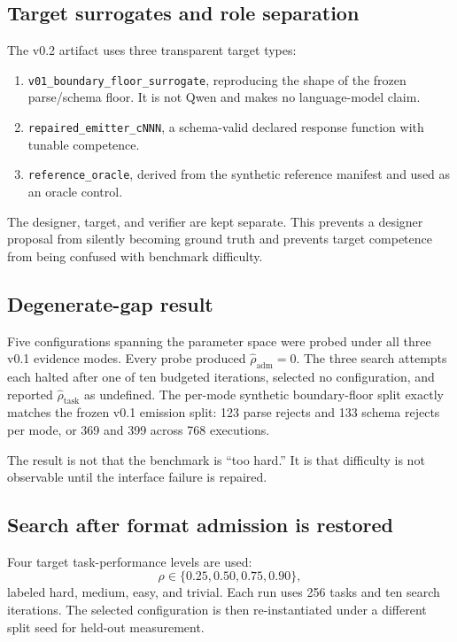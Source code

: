 \documentclass[11pt]{article}
\newcommand{\rhatadm}{\widehat{\rho}_{\mathrm{adm}}}
\newcommand{\rhattask}{\widehat{\rho}_{\mathrm{task}}}
\newcommand{\code}[1]{\texttt{#1}}
\begin{document}
\subsection{Target surrogates and role separation}

The v0.2 artifact uses three transparent target types:

\begin{enumerate}
  \item \code{v01\_boundary\_floor\_surrogate}, reproducing the shape of the frozen parse/schema floor. It is not Qwen and makes no language-model claim.
  \item \code{repaired\_emitter\_cNNN}, a schema-valid declared response function with tunable competence.
  \item \code{reference\_oracle}, derived from the synthetic reference manifest and used as an oracle control.
\end{enumerate}

The designer, target, and verifier are kept separate. This prevents a designer proposal from silently becoming ground truth and prevents target competence from being confused with benchmark difficulty.

\subsection{Degenerate-gap result}

Five configurations spanning the parameter space were probed under all three v0.1 evidence modes. Every probe produced \(\rhatadm=0\). The three search attempts each halted after one of ten budgeted iterations, selected no configuration, and reported \(\rhattask\) as undefined. The per-mode synthetic boundary-floor split exactly matches the frozen v0.1 emission split: 123 parse rejects and 133 schema rejects per mode, or 369 and 399 across 768 executions.

The result is not that the benchmark is ``too hard.'' It is that difficulty is not observable until the interface failure is repaired.

\subsection{Search after format admission is restored}

Four target task-performance levels are used:
\[
\rho\in\{0.25,0.50,0.75,0.90\},
\]
labeled hard, medium, easy, and trivial. Each run uses 256 tasks and ten search iterations. The selected configuration is then re-instantiated under a different split seed for held-out measurement.
\end{document}
